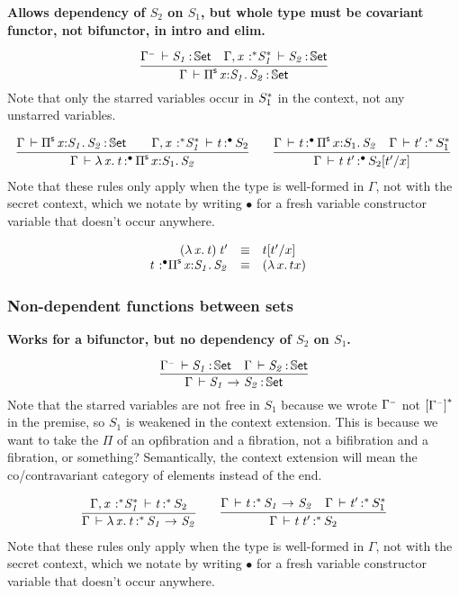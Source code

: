 \documentclass[11pt]{article}
\theoremstyle{plain}
\begin{document}
\textbf{Allows dependency of $S_2$ on $S_1$, but whole type must be
  covariant functor, not bifunctor, in intro and elim.}

\[
\infer{\oftp{\Gamma}{\piset{x}{S_1}{S_2}}{\types}}
      {\oftp{\Gamma^\con}{S_1}{\types} &
        \oftp{\Gamma, \tptmv {x}{\vcond}{S_1^\vcond}}{S_2}{\types}}
\]
Note that only the starred variables occur in $S_1^{{\mathord{*}}}$ in the
context, not any unstarred variables.  

\[
\begin{array}{c}
\infer{\oftpe{\Gamma}{\ulam{x}{t}}{\bullet}{\piset x {S_1} {S_2}}}
      { \ofdtp{\Gamma}{\piset{x}{S_1}{S_2}}{\types} & 
        & \oftpe{\Gamma, \tptmv x {\vcond} {S_1^\vcond} }{t}{\bullet}{S_2}}
\qquad
\infer{\oftpe{\Gamma}{\app t {t'}}{\bullet}{\tsubst {S_2} {{t'}/ x}}}
      {\oftpe{\Gamma}{t}{\bullet}{\piset{x}{S_1}{S_2}} &
        \oftpe{\Gamma}{t'}{\vcond}{S_1^\vcond}}
\end{array}
\]
Note that these rules only apply when the type is well-formed in
$\Gamma$, not with the secret context, which we notate by writing
$\bullet$ for a fresh variable constructor variable that doesn't occur
anywhere.

\[
\begin{array}{rcll}
\mathit{({\lambda\,x.\,t}) \: t'} & \equiv & t [ t' / x ] \\
\mathit{t} \,^{\,}{:}^{\bullet} \mathit{\textnormal{$\Pi$}^{\mathsf{s}}\,x \mathit{:} S_1.\,\mathit{S_2}} & \equiv & {({\lambda\,x.\,t}{x})} &
\end{array} \\
\]

\subsubsection{Non-dependent functions between sets}

\textbf{Works for a bifunctor, but no dependency of $S_2$ on $S_1$.}

\[
\infer{\oftp{\Gamma}{\arr{S_1}{S_2}}{\types}}
      {\oftp{\Gamma^\con}{S_1}{\types} &
        \oftp{\Gamma}{S_2}{\types}}
\]
Note that the starred variables are not free in $S_1$ because we wrote
$\Gamma^{{\text{\tiny $\mathord{-}$}}}$ not $\left[\Gamma^{{\text{\tiny $\mathord{-}$}}}\right]^{{\mathord{*}}}$ in the premise, so $S_1$ is
weakened in the context extension.  This is because we want to take the
$\Pi$ of an opfibration and a fibration, not a bifibration and a
fibration, or something?  Semantically, the context extension will mean
the co/contravariant category of elements instead of the end.  

\[
\begin{array}{c}
\infer{\oftpe{\Gamma}{\ulam{x}{t}}{\vcond}{\arr {S_1} {S_2}}}
      {\oftpe{\Gamma, \tptmv x {\vcond} {S_1^\vcond} }{t}{\vcond}{S_2}}
\qquad
\infer{\oftpe{\Gamma}{\app t {t'}}{\vcond}{{S_2}}}
      {\oftpe{\Gamma}{t}{\vcond}{\arr{S_1}{S_2}} &
        \oftpe{\Gamma}{t'}{\vcond}{S_1^\vcond}}
\end{array}
\]
Note that these rules only apply when the type is well-formed in
$\Gamma$, not with the secret context, which we notate by writing
$\bullet$ for a fresh variable constructor variable that doesn't occur
anywhere.
\end{document}
